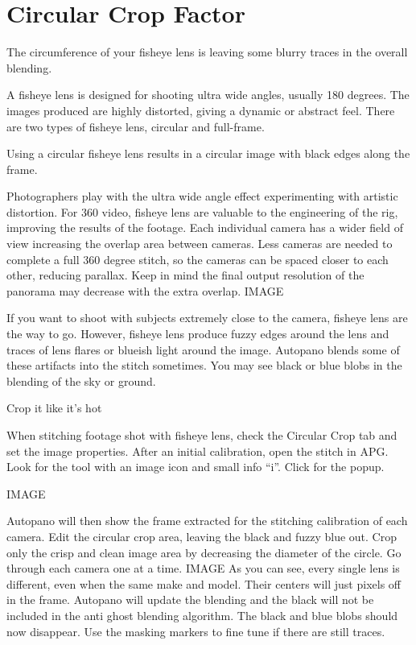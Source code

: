 \chapter{Circular Crop Factor}
\pagecolor{white}
\label{chap:43}
\begin{fullwidth}

\problem

{\large The circumference of your fisheye lens is leaving some blurry traces in the overall blending. \par}

A fisheye lens is designed for shooting ultra wide angles, usually 180 degrees. The images produced are highly distorted, giving a dynamic or abstract feel. There are two types of fisheye lens, circular and full-frame. 

Using a circular fisheye lens results in a circular image with black edges along the frame.

Photographers play with the ultra wide angle effect experimenting with artistic distortion.  For 360 video, fisheye lens are valuable to the engineering of the rig, improving the results of the footage. Each individual camera has a wider field of view increasing the overlap area between cameras. Less cameras are needed to complete a full 360 degree stitch, so the cameras can be spaced closer to each other, reducing parallax. Keep in mind the final output resolution of the panorama may decrease with the extra overlap. IMAGE

If you want to shoot with subjects extremely close to the camera, fisheye lens are the way to go. However, fisheye lens produce fuzzy edges around the lens and traces of lens flares or blueish light around the image. Autopano blends some of these artifacts into the stitch sometimes. You may see black or blue blobs in the blending of the sky or ground.

\solution

{\large Crop it like it’s hot \par}

When stitching footage shot with fisheye lens, check the Circular Crop tab and set the image properties. After an initial calibration, open the stitch in APG. Look for the tool with an image icon and small info “i”. Click for the popup.

IMAGE

Autopano will then show the frame extracted for the stitching calibration of each camera. Edit the circular crop area, leaving the black and fuzzy blue out. Crop only the crisp and clean image area by decreasing the diameter of the circle. Go through each camera one at a time. IMAGE As you can see, every single lens is different, even when the same make and model. Their centers will just pixels off in the frame. Autopano will update the blending and the black will not be included in the anti ghost blending algorithm. The black and blue blobs should now disappear. Use the masking markers to fine tune if there are still traces.

\clearpage
\end{fullwidth}